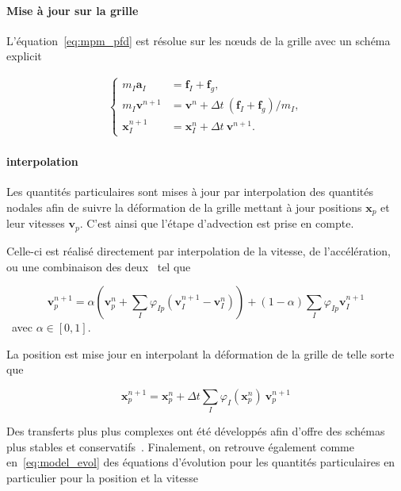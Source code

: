 \paragraph*{Mise à jour sur la grille}

L'équation~\ref{eq:mpm_pfd} est résolue sur les nœuds de la grille avec un schéma explicit

\begin{gather*}
    \left\{\begin{aligned}
        m_I \bm a_I     & =  \bm f_I + \bm f_g,                               \\
        m_I \bm v^{n+1} & =  \bm v^{n} + \Delta t~ (\bm f_I + \bm f_g) / m_I, \\
        \bm x_I^{n+1}   & =  \bm x_I^{n} + \Delta t~\bm v^{n+1}.
    \end{aligned} \right.
\end{gather*}

\paragraph*{interpolation}

Les quantités particulaires sont mises à jour par interpolation des quantités nodales afin de suivre la déformation de la grille mettant à jour positions $\bm x_p$ et leur vitesses $\bm v_p$. C'est ainsi que l'étape d'advection est prise en compte.

Celle-ci est réalisé directement par interpolation de la vitesse, de l'accélération, ou une combinaison des deux~\cite{stomakhin2013material} tel que

\begin{equation*}
    \bm v_{p}^{n+1} = \alpha \left(\bm v_{p}^{n} + \sum_I \varphi_{Ip} (\bm v_I^{n+1} - \bm v_I^{n})\right) + (1- \alpha)\sum_I \varphi_{Ip} \bm v_I^{n+1}
\end{equation*}~avec $\alpha \in [0, 1]$.

La position est mise jour en interpolant la déformation de la grille de telle sorte que

\begin{equation*}
    \bm x_p^{n+1} = \bm x_p^{n} + \Delta t \sum_I \varphi_I(\bm x_p^n)~\bm v_p^{n+1}
\end{equation*}

Des transferts plus plus complexes ont été développés afin d'offre des schémas plus stables et conservatifs~\cite{jiang_affine_2015,fu_polynomial_2017,hu_moving_2018}. Finalement, on retrouve également comme en~\eqref{eq:model_evol} des équations d'évolution pour les quantités particulaires en particulier pour la position et la vitesse

